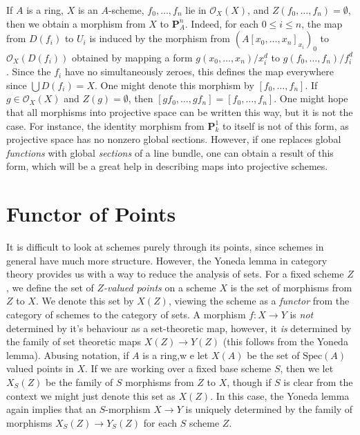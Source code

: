 If $A$ is a ring, $X$ is an $A$-scheme, $f_0,\dots,f_n$ lie in $\mathcal{O}_X(X)$, and $Z(f_0,\dots,f_n) = \emptyset$, then we obtain a morphism from $X$ to $\mathbf{P}^n_A$. Indeed, for each $0 \leq i \leq n$, the map from $D(f_i)$ to $U_i$ is induced by the morphism from $(A[x_0,\dots,x_n]_{x_i})_0$ to $\mathcal{O}_X(D(f_i))$ obtained by mapping a form $g(x_0,\dots,x_n)/x_i^d$ to $g(f_0,\dots,f_n)/f_i^d$. Since the $f_i$ have no simultaneously zeroes, this defines the map everywhere since $\bigcup D(f_i) = X$. One might denote this morphism by $[f_0,\dots,f_n]$. If $g \in \mathcal{O}_X(X)$ and $Z(g) = \emptyset$, then $[gf_0,\dots,gf_n] = [f_0,\dots,f_n]$. One might hope that all morphisms into projective space can be written this way, but it is not the case. For instance, the identity morphism from $\mathbf{P}^1_k$ to itself is not of this form, as projective space has no nonzero global sections. However, if one replaces global \emph{functions} with global \emph{sections} of a line bundle, one can obtain a result of this form, which will be a great help in describing maps into projective schemes.













\section{Functor of Points}

It is difficult to look at schemes purely through its points, since schemes in general have much more structure. However, the Yoneda lemma in category theory provides us with a way to reduce the analysis of sets. For a fixed scheme $Z$, we define the set of \emph{$Z$-valued points} on a scheme $X$ is the set of morphisms from $Z$ to $X$. We denote this set by $X(Z)$, viewing the scheme as a \emph{functor} from the category of schemes to the category of sets. A morphism $f: X \to Y$ is \emph{not} determined by it's behaviour as a set-theoretic map, however, it \emph{is} determined by the family of set theoretic maps $X(Z) \to Y(Z)$ (this follows from the Yoneda lemma). Abusing notation, if $A$ is a ring,w e let $X(A)$ be the set of $\text{Spec}(A)$ valued points in $X$. If we are working over a fixed base scheme $S$, then we let $X_S(Z)$ be the family of $S$ morphisms from $Z$ to $X$, though if $S$ is clear from the context we might just denote this set as $X(Z)$. In this case, the Yoneda lemma again implies that an $S$-morphism $X \to Y$ is uniquely determined by the family of morphisms $X_S(Z) \to Y_S(Z)$ for each $S$ scheme $Z$.

